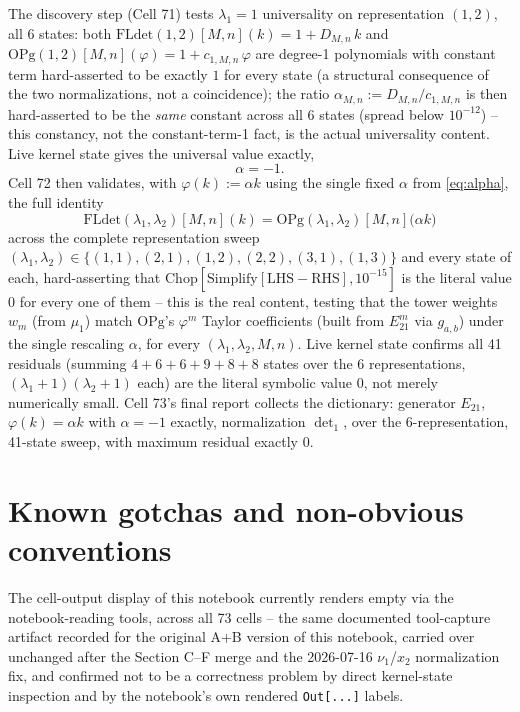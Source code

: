 \documentclass[11pt]{article}
\begin{document}
The discovery step (Cell 71) tests $\lambda_1=1$ universality on representation $(1,2)$, all 6
states: both $\mathrm{FLdet}(1,2)[M,n](k) = 1 + D_{M,n}\,k$ and
$\mathrm{OPg}(1,2)[M,n](\varphi) = 1 + c_{1,M,n}\,\varphi$ are degree-1 polynomials with constant
term hard-asserted to be exactly $1$ for every state (a structural consequence of the two
normalizations, not a coincidence); the ratio
$\alpha_{M,n} := D_{M,n}/c_{1,M,n}$ is then hard-asserted to be the \emph{same} constant across all
6 states (spread below $10^{-12}$) -- this constancy, not the constant-term-1 fact, is the actual
universality content. Live kernel state gives the universal value exactly,
\begin{equation}
  \alpha = -1.
  \label{eq:alpha}
\end{equation}
Cell 72 then validates, with $\varphi(k) := \alpha k$ using the single fixed $\alpha$ from
\eqref{eq:alpha}, the full identity
\begin{equation}
  \mathrm{FLdet}(\lambda_1,\lambda_2)[M,n](k) = \mathrm{OPg}(\lambda_1,\lambda_2)[M,n]\bigl(\alpha k\bigr)
  \label{eq:dictionary}
\end{equation}
across the complete representation sweep $(\lambda_1,\lambda_2)\in\{(1,1),(2,1),(1,2),(2,2),(3,1),
(1,3)\}$ and every state of each, hard-asserting that
$\mathrm{Chop}[\mathrm{Simplify}[\mathrm{LHS}-\mathrm{RHS}],10^{-15}]$ is the literal value $0$ for
every one of them -- this is the real content, testing that the tower weights $w_m$ (from $\mu_1$)
match $\mathrm{OPg}$'s $\varphi^m$ Taylor coefficients (built from $E_{21}^m$ via $g_{a,b}$) under
the single rescaling $\alpha$, for every $(\lambda_1,\lambda_2,M,n)$. Live kernel state confirms all
41 residuals (summing $4+6+6+9+8+8$ states over the 6 representations,
$(\lambda_1+1)(\lambda_2+1)$ each) are the literal symbolic value $0$, not merely numerically small.
Cell 73's final report collects the dictionary: generator $E_{21}$, $\varphi(k)=\alpha k$ with
$\alpha=-1$ exactly, normalization $\det_1$, over the 6-representation, 41-state sweep, with maximum
residual exactly $0$.

\section{Known gotchas and non-obvious conventions}

The cell-output display of this notebook currently renders empty via the notebook-reading tools,
across all 73 cells -- the same documented tool-capture artifact recorded for the original A+B
version of this notebook, carried over unchanged after the Section C--F merge and the 2026-07-16
$\nu_1$/$x_2$ normalization fix, and confirmed not to be a correctness problem by direct
kernel-state inspection and by the notebook's own rendered \texttt{Out[...]} labels.
\end{document}
